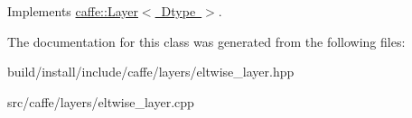 Implements \mbox{\hyperlink{classcaffe_1_1_layer_a7fe981e8af8d93d587acf2a952be563d}{caffe\+::\+Layer$<$ Dtype $>$}}.



The documentation for this class was generated from the following files\+:\begin{DoxyCompactItemize}
\item 
build/install/include/caffe/layers/eltwise\+\_\+layer.\+hpp\item 
src/caffe/layers/eltwise\+\_\+layer.\+cpp\end{DoxyCompactItemize}

